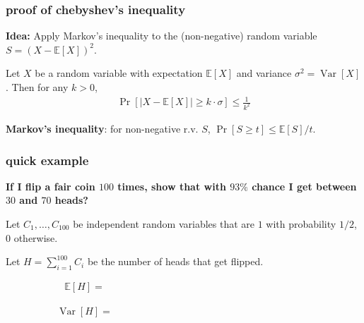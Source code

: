 \documentclass[handout,compress]{beamer}
\newcommand{\E}{\mathbb{E}}
\newcommand{\blue}[1]{\textcolor{blue}{#1}}
\DeclareMathOperator{\Var}{Var}
\begin{document}
\begin{frame}
	\frametitle{proof of chebyshev's inequality}
	\small
	\textbf{Idea:} Apply Markov's inequality to the (non-negative) random variable $S = (X-\E[X])^2$.
	\begin{lemma}
		Let $X$ be a random variable with expectation $\E[X]$ and variance $\sigma^2 = \Var[X]$. Then for any $k > 0$,
		\begin{align*}
			\Pr[|X - \E[X]| \geq k\cdot\sigma] \leq \frac{1}{k^2}
		\end{align*}
	\end{lemma}
	
	\vspace{7em}
	\begin{block}{\vspace*{-3ex}}
		\small \textbf{Markov's inequality}: for non-negative r.v. $S$, $\Pr[S \geq t] \leq \E[S]/t$.  
	\end{block}
\end{frame}

\begin{frame}
	\frametitle{quick example}
	\begin{center}
	\textbf{If I flip a fair coin $100$ times, show that with $93\%$ chance I get between $30$ and $70$ heads?}
	\end{center}
	Let $C_1, \ldots, C_{100}$ be independent random variables that are $1$ with probability $1/2$, $0$ otherwise.

	Let $H = \sum_{i=1}^{100} C_i$ be the number of heads that get flipped.	
	
	\begin{align*}
		\E[H] = \hspace{20em}
	\end{align*}

	\begin{align*}
	\Var[H] = \hspace{20em}
	\end{align*}
\vspace{4em}
\end{frame}
\end{document}
